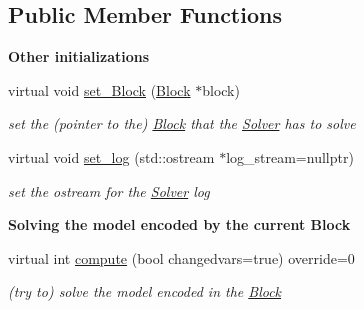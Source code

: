 \subsection*{Public Member Functions}
\begin{Indent}\textbf{ Other initializations}\par
\begin{DoxyCompactItemize}
\item 
virtual void \mbox{\hyperlink{class_s_m_spp__di__unipi__it_1_1_solver_a73965be2cfab47947f0166116bf4a3cc}{set\+\_\+\+Block}} (\mbox{\hyperlink{class_s_m_spp__di__unipi__it_1_1_block}{Block}} $\ast$block)
\begin{DoxyCompactList}\small\item\em set the (pointer to the) \mbox{\hyperlink{class_s_m_spp__di__unipi__it_1_1_block}{Block}} that the \mbox{\hyperlink{class_s_m_spp__di__unipi__it_1_1_solver}{Solver}} has to solve \end{DoxyCompactList}\item 
virtual void \mbox{\hyperlink{class_s_m_spp__di__unipi__it_1_1_solver_aba02e3287c6c72bbacb555295168d0e8}{set\+\_\+log}} (std\+::ostream $\ast$log\+\_\+stream=nullptr)
\begin{DoxyCompactList}\small\item\em set the ostream for the \mbox{\hyperlink{class_s_m_spp__di__unipi__it_1_1_solver}{Solver}} log \end{DoxyCompactList}\end{DoxyCompactItemize}
\end{Indent}
\begin{Indent}\textbf{ Solving the model encoded by the current Block}\par
\begin{DoxyCompactItemize}
\item 
virtual int \mbox{\hyperlink{class_s_m_spp__di__unipi__it_1_1_solver_a504d4e3e174c7a518cc66156a8a45ce5}{compute}} (bool changedvars=true) override=0
\begin{DoxyCompactList}\small\item\em (try to) solve the model encoded in the \mbox{\hyperlink{class_s_m_spp__di__unipi__it_1_1_block}{Block}} \end{DoxyCompactList}\end{DoxyCompactItemize}
\end{Indent}
